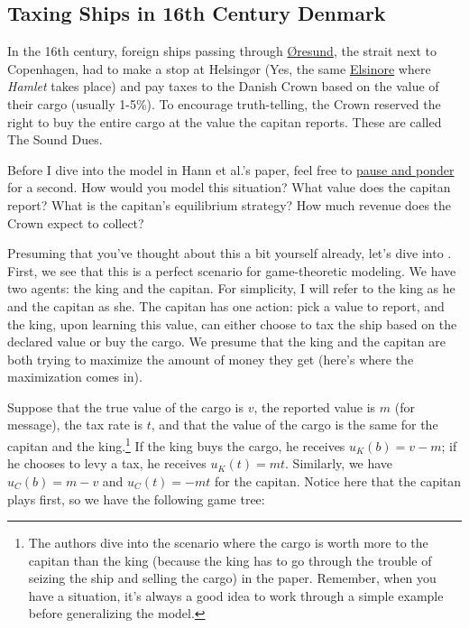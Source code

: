 \subsection*{Taxing Ships in 16th Century Denmark \citep{Haan_2012_Taxation}}

In the 16th century, foreign ships passing through \href{https://www.google.com/maps?q=%C3%98resund&=Search%20Google%20Maps}{Øresund}, the strait next to Copenhagen, had to make a stop at Helsingør (Yes, the same \href{https://en.wikipedia.org/wiki/Hamlet}{Elsinore} where \textit{Hamlet} takes place) and pay taxes to the Danish Crown based on the value of their cargo (usually 1-5\%). To encourage truth-telling, the Crown reserved the right to buy the entire cargo at the value the capitan reports. These are called The Sound Dues. 

Before I dive into the model in Hann et al.'s paper, feel free to \href{https://pbs.twimg.com/media/C1hNo_KUcAAJDQ9.jpg:large}{pause and ponder} for a second. How would you model this situation? What value does the capitan report? What is the capitan's equilibrium strategy? How much revenue does the Crown expect to collect?

Presuming that you've thought about this a bit yourself already, let's dive into \citet{Haan_2012_Taxation}. First, we see that this is a perfect scenario for game-theoretic modeling. We have two agents: the king and the capitan. For simplicity, I will refer to the king as he and the capitan as she. The capitan has one action: pick a value to report, and the king, upon learning this value, can either choose to tax the ship based on the declared value or buy the cargo. We presume that the king and the capitan are both trying to maximize the amount of money they get (here's where the maximization comes in). 

Suppose that the true value of the cargo is $v$, the reported value is $m$ (for message), the tax rate is $t$, and that the value of the cargo is the same for the capitan and the king.\footnote{The authors dive into the scenario where the cargo is worth more to the capitan than the king (because the king has to go through the trouble of seizing the ship and selling the cargo) in the paper. Remember, when you have a situation, it's always a good idea to work through a simple example before generalizing the model.} If the king buys the cargo, he receives $u_K(b) = v - m$; if he chooses to levy a tax, he receives $u_K(t) = mt$. Similarly, we have $u_C(b) = m - v$ and $u_C(t) = -mt$ for the capitan. Notice here that the capitan plays first, so we have the following game tree:

